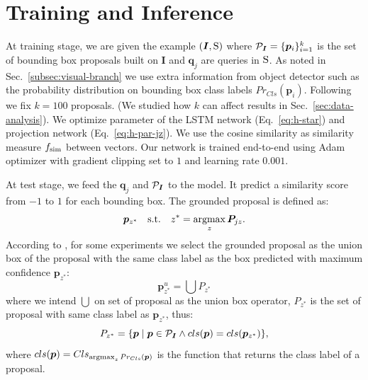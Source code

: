 \section{Training and Inference}
\label{sec:training-and-inference}

At training stage, we are given the example $(\bm{I}, \mathrm{S})$ where
$\mathcal{P}_{\bm{I}} = \{ \bm{p}_i \}^k_{i=1}$ is the set of bounding box
proposals built on $\bm{I}$ and $\bm{q}_j$ are queries in $\mathrm{S}$. As
noted in Sec.~\ref{subsec:visual-branch} we use extra information from
object detector such as the probability distribution on bounding box
class labels $Pr_{Cls}(\bm{p}_i)$. Following \cite{chen2018knowledge}
we fix $k = 100$ proposals. (We studied how $k$ can affect results in
Sec.~\ref{sec:data-analysis}). We optimize parameter of the LSTM
network (Eq.~\ref{eq:h-star}) and projection network
(Eq.~\ref{eq:h-par-jz}). We use the cosine similarity as similarity
measure $f_{\text{sim}}$ between vectors. Our network is trained end-to-end
using Adam optimizer with gradient clipping set to $1$ and learning
rate $0.001$.

At test stage, we feed the $\bm{q}_j$ and $\mathcal{P}_{\bm{I}}$ to the
model. It predict a similarity score from $-1$ to $1$ for each
bounding box. The grounded proposal is defined as:
\begin{equation}
  \bm{p}_{z^*} \quad \text{s.t.} \quad z^* = \operatorname*{argmax}_z \bm{P}_{jz}.
\end{equation}
According to \cite{wang2019phrase}, for some experiments we select the
grounded proposal as the union box of the proposal with the same class
label as the box predicted with maximum confidence $\bm{p}_{z^*}$:
\begin{equation}
  \bm{p}^u_{z^*} = \bigcup P_{z^*}
\end{equation}
where we intend $\bigcup$ on set of proposal as the union box
operator, $P_{z^*}$ is the set of proposal with same class label as
$\bm{p}_{z^*}$, thus:
\begin{equation}
  P_{z^*} = \{ \bm{p} \mid \bm{p} \in \mathcal{P}_{\bm{I}} \land cls(\bm{p}) = cls(\bm{p}_{z^*}) \},
\end{equation}
where $cls(\bm{p}) = Cls_{\operatorname*{argmax}_z Pr_{Cls}(\bm{p})}$ is the function
that returns the class label of a proposal.
